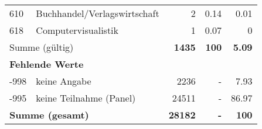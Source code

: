 \begin{longtable}{lXrrr}
        610 & \multicolumn{1}{X}{Buchhandel/Verlagswirtschaft} & %
          \num{2} &
          \num[round-mode=places,round-precision=2]{0.14} &
          \num[round-mode=places,round-precision=2]{0.01} \\

        618 & \multicolumn{1}{X}{Computervisualistik} & %
          \num{1} &
          \num[round-mode=places,round-precision=2]{0.07} &
          \num[round-mode=places,round-precision=2]{0} \\

     \midrule
     \multicolumn{2}{l}{Summe (gültig)} &
       \textbf{\num{1435}} &
     \textbf{\num{100}} &
       \textbf{\num[round-mode=places,round-precision=2]{5.09}} \\
     \multicolumn{5}{l}{\textbf{Fehlende Werte}}\\
       -998 &
       keine Angabe &
         \num{2236} &
        - &
         \num[round-mode=places,round-precision=2]{7.93} \\
       -995 &
       keine Teilnahme (Panel) &
         \num{24511} &
        - &
         \num[round-mode=places,round-precision=2]{86.97} \\
     \midrule
     \multicolumn{2}{l}{\textbf{Summe (gesamt)}} &
          \textbf{\num{28182}} &
        \textbf{-} &
        \textbf{\num{100}} \\
     \bottomrule
     \end{longtable}
     
